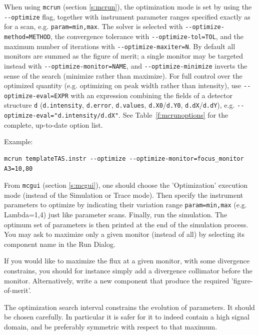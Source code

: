 When using \verb+mcrun+ (section \ref{s:mcrun}), the optimization mode is set by
using the \verb+--optimize+ flag, together with instrument parameter ranges
specified exactly as for a scan, e.g. \verb+param=min,max+. The solver is
selected with \verb+--optimize-method=METHOD+, the convergence tolerance with
\verb+--optimize-tol=TOL+, and the maximum number of iterations with
\verb+--optimize-maxiter=N+. By default all monitors are summed as the
figure of merit; a single monitor may be targeted instead with
\verb+--optimize-monitor=NAME+, and \verb+--optimize-minimize+ inverts the
sense of the search (minimize rather than maximize). For full control over
the optimized quantity (e.g. optimizing on peak width rather than
intensity), use \verb+--optimize-eval=EXPR+ with an expression combining
the fields of a detector structure \texttt{d} (\texttt{d.intensity},
\texttt{d.error}, \texttt{d.values}, \texttt{d.X0}/\texttt{d.Y0},
\texttt{d.dX}/\texttt{d.dY}), e.g.
\verb+--optimize-eval="d.intensity/d.dX"+. See Table~\ref{f:mcrunoptions}
for the complete, up-to-date option list.

Example:
\begin{lstlisting}
mcrun templateTAS.instr --optimize --optimize-monitor=focus_monitor A3=10,80
\end{lstlisting}

From \verb+mcgui+ (section \ref{s:mcgui}), one should choose the 'Optimization'
execution mode (instead of the Simulation or Trace mode). Then specify the
instrument parameters to optimize by indicating their variation range
\verb+param=min,max+ (e.g. Lambda=1,4) just like parameter scans. Finally, run
the simulation. The optimum set of parameters is then printed at the end of
the simulation process. You may ask to maximize only a given monitor (instead
of all) by selecting its component name in the Run Dialog.

If you would like to maximize the flux at a given monitor, with some
divergence constrains, you should for instance simply add a divergence
collimator before the monitor. Alternatively, write a new component
that produce the required 'figure-of-merit'.

The optimization search interval constrains the evolution of
parameters. It should be chosen carefully. In particular it is safer
for it to indeed contain a high signal domain, and be preferably
symmetric with respect to that maximum.

